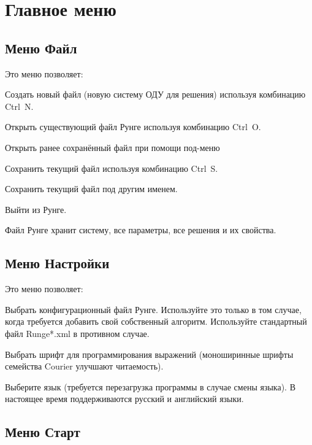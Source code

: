\documentclass[12pt]{article}
\begin{document}
\section{Главное меню}

\subsection{Меню Файл}


Это меню позволяет:
\begin{compactitem}
\item Создать новый файл (новую систему ОДУ для решения) 
используя комбинацию Ctrl~N.
\item Открыть существующий файл Рунге используя комбинацию Ctrl~O.
\item Открыть ранее сохранённый файл при помощи под-меню


\item Сохранить текущий файл используя комбинацию Ctrl~S.
\item Сохранить текущий файл под другим именем.
\item Выйти из Рунге.
\end{compactitem}

Файл Рунге хранит систему, все параметры, все решения и их свойства.

\subsection{Меню Настройки}


Это меню позволяет:
\begin{compactitem}
\item Выбрать конфигурационный файл Рунге. Используйте это только в том случае,
когда требуется добавить свой собственный алгоритм.
Используйте стандартный файл Runge*.xml в противном случае.
\item Выбрать шрифт для программирования выражений 
(моноширинные шрифты семейства Courier улучшают читаемость).
\item Выберите язык (требуется перезагрузка программы в случае смены языка). 
В настоящее время поддерживаются русский и английский языки. 
\end{compactitem}


\subsection{Меню Старт}
\end{document}
